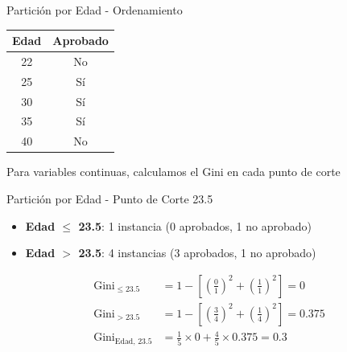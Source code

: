 \documentclass{beamer}
\begin{document}
\begin{frame}{Partición por Edad - Ordenamiento}
    \begin{center}
        \begin{tabular}{cc}
            \toprule
            Edad & Aprobado \\
            \midrule
            22 & No \\
            25 & Sí \\
            30 & Sí \\
            35 & Sí \\
            40 & No \\
            \bottomrule
        \end{tabular}
    \end{center}
    
    \vspace{1em}
    
    \begin{center}
        \Large Para variables continuas, calculamos el Gini en cada punto de corte
    \end{center}
\end{frame}

\begin{frame}{Partición por Edad - Punto de Corte 23.5}
    \begin{itemize}
        \item \textbf{Edad $\leq$ 23.5}: 1 instancia (0 aprobados, 1 no aprobado)
        \item \textbf{Edad $>$ 23.5}: 4 instancias (3 aprobados, 1 no aprobado)
    \end{itemize}
    
    \vspace{0.5em}
    
    \begin{align*}
        \mathrm{Gini}_{\leq 23.5} &= 1 - \left[\left(\tfrac{0}{1}\right)^2 + \left(\tfrac{1}{1}\right)^2\right] = 0 \\
        \mathrm{Gini}_{> 23.5} &= 1 - \left[\left(\tfrac{3}{4}\right)^2 + \left(\tfrac{1}{4}\right)^2\right] = 0.375 \\
        \mathrm{Gini}_{\text{Edad, 23.5}} &= \tfrac{1}{5}\times0 + \tfrac{4}{5}\times0.375 = 0.3
    \end{align*}
\end{frame}
\end{document}
